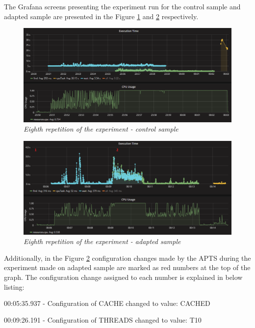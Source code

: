 \documentclass[12pt,a4paper]{article}
\let\tmpone\enumerate
\let\tmptwo\endenumerate
\renewenvironment{enumerate}{\tmpone\addtolength{\itemsep}{-0.4\baselineskip}}{\tmptwo}
\begin{document}
The Grafana screens presenting the experiment run for the control sample and adapted sample are presented in the Figure \ref{figure:random:screen:control:8} and \ref{figure:random:screen:adapted:8} respectively. 

\begin{figure}[!htb]
\centering
\includegraphics[width=1\textwidth]{8-ctrl}
\caption{\textit{Eighth repetition of the experiment - control sample}} \label{figure:random:screen:control:8}
\end{figure}

\begin{figure}[!htb]
\centering
\includegraphics[width=1\textwidth]{8-adap}
\caption{\textit{Eighth repetition of the experiment - adapted sample}} \label{figure:random:screen:adapted:8}
\end{figure}

Additionally, in the Figure \ref{figure:random:screen:adapted:8} configuration changes made by the APTS during the experiment made on adapted sample are marked as red numbers at the top of the graph. The configuration change assigned to each number is explained in below listing: 

\begin{enumerate}
\item 00:05:35.937 - Configuration of CACHE changed to value: CACHED
\item 00:09:26.191 - Configuration of THREADS changed to value: T10
\end{enumerate}
\end{document}
